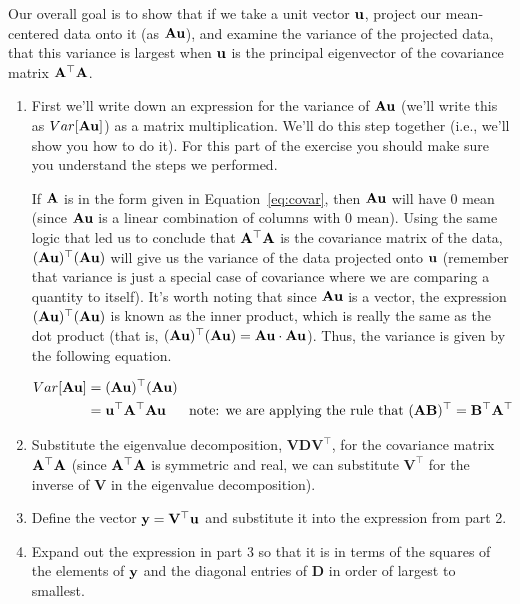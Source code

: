 \begin{prob}
Our overall goal is to show that if we take a unit vector $\mathbf{u}$, project our mean-centered data onto it (as $\mathbf{A} \mathbf{u}$), and examine the variance of the projected data, that this variance is largest when $\mathbf{u}$ is the principal eigenvector of the covariance matrix $\mathbf{A}^\top \mathbf{A}$.

\begin{enumerate}
\item First we'll write down an expression for the variance of $\mathbf{A} \mathbf{u}$ (we'll write this as $Var[ \mathbf{A} \mathbf{u}]$) as a matrix multiplication.  We'll do this step together (i.e., we'll show you how to do it).  For this part of the exercise you should make sure you understand the steps we performed.

If $\mathbf{A}$ is in the form given in Equation~\ref{eq:covar}, then $\mathbf{A} \mathbf{u}$ will have 0 mean (since $\mathbf{A} \mathbf{u}$ is a linear combination of columns with 0 mean).  Using the same logic that led us to conclude that $\mathbf{A}^\top \mathbf{A}$ is the covariance matrix of the data, $(\mathbf{A} \mathbf{u})^\top (\mathbf{A} \mathbf{u})$ will give us the variance of the data projected onto $\mathbf{u}$ (remember that variance is just a special case of covariance where we are comparing a quantity to itself).  It's worth noting that since $\mathbf{A} \mathbf{u}$ is a vector, the expression $(\mathbf{A} \mathbf{u})^\top (\mathbf{A} \mathbf{u})$ is known as the inner product, which is really the same as the dot product (that is, $(\mathbf{A} \mathbf{u})^\top (\mathbf{A} \mathbf{u}) = \mathbf{A} \mathbf{u} \cdot \mathbf{A} \mathbf{u}$).  Thus, the variance is given by the following equation.

\begin{align*}
Var[\mathbf{A} \mathbf{u}] &= (\mathbf{A} \mathbf{u})^\top (\mathbf{A} \mathbf{u}) \\
&= \mathbf{u}^\top \mathbf{A}^\top \mathbf{A} \mathbf{u} ~~~~~\mbox{note: we are applying the rule that } (\mathbf{A}\mathbf{B})^\top = \mathbf{B}^\top \mathbf{A}^\top
\end{align*}

\item Substitute  the eigenvalue decomposition,  $\mathbf{V} \mathbf{D} \mathbf{V}^\top$,  for the covariance matrix $\mathbf{A}^\top \mathbf{A}$ (since $\mathbf{A}^\top \mathbf{A}$ is symmetric and real, we can substitute $\mathbf{V}^\top$ for the inverse of $\mathbf{V}$ in the eigenvalue decomposition).

\item Define the vector $\mathbf{y} = \mathbf{V}^\top \mathbf{u}$ and substitute it into the expression from part 2.

\item Expand out the expression in part 3 so that it is in terms of the squares of the elements of $\mathbf{y}$ and the diagonal entries of $\mathbf{D}$ in order of largest to smallest.


\end{enumerate}
\end{prob}

